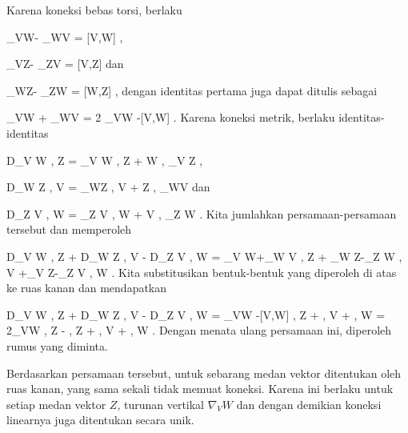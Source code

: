 {

Karena koneksi bebas torsi, berlaku

\mavergleichskettedisp
{\vergleichskette
{ \nabla_VW- \nabla_WV
}
{ =} { [V,W]
}
{ } {
}
{ } {
}
{ } {
}
}
{}{}{,}

\mavergleichskettedisp
{\vergleichskette
{ \nabla_VZ- \nabla_ZV
}
{ =} { [V,Z]
}
{ } {
}
{ } {
}
{ } {
}
}
{}{}{}
dan

\mavergleichskettedisp
{\vergleichskette
{ \nabla_WZ- \nabla_ZW
}
{ =} { [W,Z]
}
{ } {
}
{ } {
}
{ } {
}
}
{}{}{,}
dengan identitas pertama juga dapat ditulis sebagai

\mavergleichskettedisp
{\vergleichskette
{ \nabla_VW + \nabla_WV
}
{ =} { 2 \nabla_VW -[V,W]
}
{ } {
}
{ } {
}
{ } {
}
}
{}{}{}.
Karena koneksi metrik, berlaku identitas-identitas

\mavergleichskettedisp
{\vergleichskette
{ D_V \left\langle  W  ,  Z  \right\rangle
}
{ =} { \left\langle \nabla_V W , Z  \right\rangle  + \left\langle  W  ,  \nabla_V Z  \right\rangle
}
{ } {
}
{ } {
}
{ } {
}
}
{}{}{,}

\mavergleichskettedisp
{\vergleichskette
{ D_W \left\langle  Z  ,  V  \right\rangle
}
{ =} { \left\langle \nabla_WZ , V  \right\rangle  + \left\langle  Z  ,  \nabla_WV  \right\rangle
}
{ } {
}
{ } {
}
{ } {
}
}
{}{}{}
dan

\mavergleichskettedisp
{\vergleichskette
{ D_Z \left\langle  V  ,  W  \right\rangle
}
{ =} { \left\langle \nabla_Z V , W  \right\rangle  + \left\langle  V  ,  \nabla_Z W   \right\rangle
}
{ } {
}
{ } {
}
{ } {
}
}
{}{}{.}
Kita jumlahkan persamaan-persamaan tersebut dan memperoleh

\mavergleichskettedisphandlinks
{\vergleichskettedisphandlinks
{ D_V \left\langle  W  ,  Z  \right\rangle+ D_W \left\langle  Z  ,  V  \right\rangle  - D_Z \left\langle  V  ,  W  \right\rangle
}
{ =} { \left\langle \nabla_V W+\nabla_W V  ,  Z  \right\rangle + \left\langle \nabla_W Z-\nabla_Z W   ,  V  \right\rangle+\left\langle  \nabla_V Z-\nabla_Z V   ,  W  \right\rangle
}
{ } {
}
{ } {
}
{ } {
}
}
{}{}{.}
Kita substitusikan bentuk-bentuk yang diperoleh di atas ke ruas kanan dan mendapatkan

\mavergleichskettealignhandlinks
{\vergleichskettealignhandlinks
{ D_V \left\langle  W  ,  Z  \right\rangle+ D_W \left\langle  Z  ,  V  \right\rangle  - D_Z \left\langle  V  ,  W  \right\rangle
}
{ =} { \left{} \nabla_VW -[V,W]  ,  Z  \right\rangle + \left\langle  [W,Z]  ,  V  \right\rangle + \left\langle [V,Z]   ,  W  \right\rangle
}
{ =} { 2\left\langle  \nabla_VW   ,  Z  \right\rangle - \left\langle  [V,W]  ,  Z  \right\rangle + \left\langle  [W,Z]  ,  V  \right\rangle + \left\langle  [V,Z]   ,  W  \right\rangle
}
{ } {
}
{ } {
}
}
{}
{}{.}
Dengan menata ulang persamaan ini, diperoleh rumus yang diminta.

Berdasarkan persamaan tersebut,
 untuk sebarang medan vektor ditentukan oleh ruas kanan, yang sama sekali tidak memuat koneksi. Karena ini berlaku untuk setiap medan vektor $Z$, turunan vertikal $\nabla_V W$ dan dengan demikian koneksi linearnya juga ditentukan secara unik.

 }
